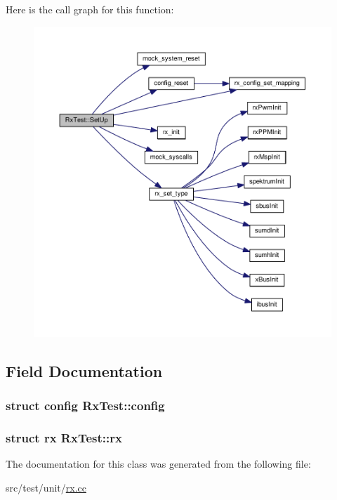 Here is the call graph for this function\+:\nopagebreak
\begin{figure}[H]
\begin{center}
\leavevmode
\includegraphics[width=350pt]{classRxTest_a56e5ac55b6ea7b5ffbf9d84fc7b71b20_cgraph}
\end{center}
\end{figure}




\subsection{Field Documentation}
\hypertarget{classRxTest_ac5721e792d613d58d9f71a43492a8045}{
\subsubsection[{config}]{\setlength{\rightskip}{0pt plus 5cm}struct {\bf config} Rx\+Test\+::config\hspace{0.3cm}{\ttfamily [protected]}}}\label{classRxTest_ac5721e792d613d58d9f71a43492a8045}
\hypertarget{classRxTest_acf1ef4a38aa9201cbff670c679889bcf}{
\subsubsection[{rx}]{\setlength{\rightskip}{0pt plus 5cm}struct {\bf rx} Rx\+Test\+::rx\hspace{0.3cm}{\ttfamily [protected]}}}\label{classRxTest_acf1ef4a38aa9201cbff670c679889bcf}


The documentation for this class was generated from the following file\+:\begin{DoxyCompactItemize}
\item 
src/test/unit/\hyperlink{rx_8cc}{rx.\+cc}\end{DoxyCompactItemize}
